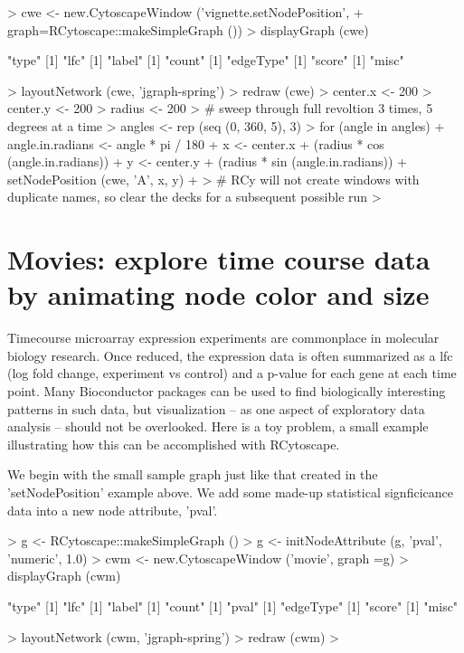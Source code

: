 \documentclass[12pt]{article}
\begin{document}
\begin{Schunk}
\begin{Sinput}
>   cwe <- new.CytoscapeWindow ('vignette.setNodePosition',
+                               graph=RCytoscape::makeSimpleGraph ())
>   displayGraph (cwe)
\end{Sinput}
\begin{Soutput}
[1] "type"
[1] "lfc"
[1] "label"
[1] "count"
[1] "edgeType"
[1] "score"
[1] "misc"
\end{Soutput}
\begin{Sinput}
>   layoutNetwork (cwe, 'jgraph-spring')
>   redraw (cwe)
>   center.x <- 200
>   center.y <- 200
>   radius <- 200
>     # sweep through full revoltion 3 times, 5 degrees at a time
>   angles <- rep (seq (0, 360, 5), 3)
>   for (angle in angles) {
+     angle.in.radians <- angle * pi / 180
+     x <- center.x + (radius * cos (angle.in.radians))
+     y <- center.y + (radius * sin (angle.in.radians))
+     setNodePosition (cwe, 'A', x, y)
+     }
>     # RCy will not create windows with duplicate names, so clear the decks for a subsequent possible run
> 
\end{Sinput}
\end{Schunk}

\section{Movies:  explore time course data by animating node color and size}

Timecourse microarray expression experiments are commonplace in molecular biology research.  Once reduced, the expression data is often summarized as a lfc (log fold change, experiment vs control) and a p-value for each gene at each time point.  Many Bioconductor packages can be used to find biologically interesting patterns in such data, but visualization -- as one aspect of exploratory data analysis -- should not be overlooked.  Here is a toy problem, a small example illustrating how this can be accomplished with RCytoscape.

We begin with the small sample graph just like that created in the 'setNodePosition' example above.  We add some made-up statistical signficicance data into a new node attribute, 'pval'.

\begin{Schunk}
\begin{Sinput}
>   g <- RCytoscape::makeSimpleGraph ()
>   g <- initNodeAttribute (g, 'pval', 'numeric', 1.0)
>   cwm <- new.CytoscapeWindow ('movie', graph =g)
>   displayGraph (cwm)
\end{Sinput}
\begin{Soutput}
[1] "type"
[1] "lfc"
[1] "label"
[1] "count"
[1] "pval"
[1] "edgeType"
[1] "score"
[1] "misc"
\end{Soutput}
\begin{Sinput}
>   layoutNetwork (cwm, 'jgraph-spring')
>   redraw (cwm)
> 
\end{Sinput}
\end{Schunk}
\end{document}
